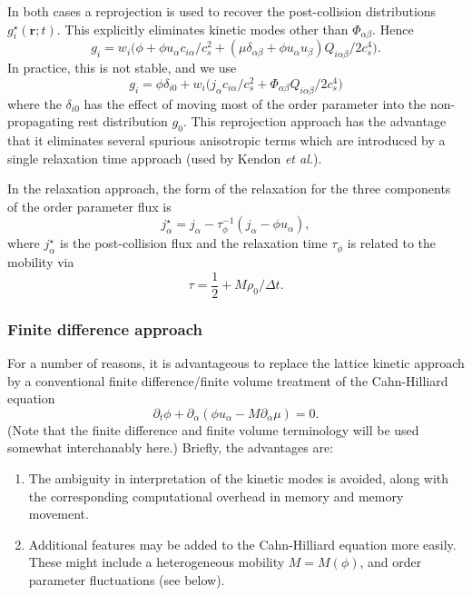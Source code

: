 In both cases a reprojection is used to recover the post-collision
distributions $g_i^\star(\mathbf{r};t)$. This explicitly eliminates
kinetic modes other than $\Phi_{\alpha\beta}$. Hence
\begin{equation}
g_i = w_i \big(\phi + \phi u_\alpha c_{i\alpha}/c_s^2 +
(\mu\delta_{\alpha\beta} + \phi u_\alpha u_\beta) Q_{i\alpha\beta}/2c_s^4\big).
\end{equation}
In practice, this is not stable, and we use
\begin{equation}
g_i = \phi\delta_{i0} + w_i \big( j_\alpha c_{i\alpha} / c_s^2
+ \Phi_{\alpha\beta}Q_{i\alpha\beta} / 2c_s^4\big)
\end{equation}
where the $\delta_{i0}$ has the effect of moving most of the order
parameter into the non-propagating rest distribution $g_0$. 
This reprojection approach has the advantage that it eliminates several
spurious anisotropic terms which are introduced by a single relaxation
time approach (used by Kendon \textit{et al.}).

In the relaxation approach, the form of the relaxation for the
three components of the order parameter flux is
\begin{equation}
j_\alpha^\star =
j_\alpha - \tau_\phi^{-1} (j_\alpha - \phi u_\alpha),
\end{equation}
where $j_\alpha^\star$ is the post-collision flux and the relaxation
time $\tau_\phi$ is related to the mobility  via
\begin{equation}
\tau = {\textstyle\frac{1}{2}} + M\rho_0/\Delta t.
\end{equation}

\subsubsection{Finite difference approach}

For a number of reasons, it is advantageous to replace the lattice
kinetic approach by a conventional finite difference/finite volume
treatment of the Cahn-Hilliard equation
\begin{equation}
\partial_t \phi + \partial_\alpha ( \phi u_\alpha - M \partial_\alpha \mu) = 0.
\end{equation}
(Note that the finite difference and finite volume terminology will
be used somewhat interchanably here.) Briefly, the advantages are:
\begin{enumerate}
\item
The ambiguity in interpretation of the kinetic modes is avoided,
along with the corresponding computational overhead in memory and
memory movement.
\item
Additional features may be added to the Cahn-Hilliard equation more
easily. These might include a heterogeneous mobility $M=M(\phi)$, and
order parameter fluctuations (see below).
\end{enumerate}

\vfill
\pagebreak
